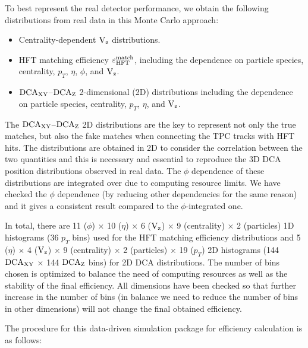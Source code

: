 \documentclass[%
 reprint,	
showpacs,
 amsmath,amssymb,
 aps,
 prc,
]{revtex4-1}
\begin{document}
To best represent the real detector performance, we obtain the following distributions from real data in this Monte Carlo approach:
 \begin{itemize} 
\item Centrality-dependent $\textup{V}_\textup{z}$ distributions.
\item HFT matching efficiency $\varepsilon_{\rm HFT}^{\rm match}$, including the dependence on particle species, centrality, $p_T$, $\eta$, $\phi$, and $\textup{V}_\textup{z}$.
\item $\textup{DCA}_{\textup{XY}}$--$\textup{DCA}_{\textup{Z}}$ 2-dimensional (2D) distributions including the dependence on particle species, centrality, $p_T$, $\eta$, and $\textup{V}_\textup{z}$.
 \end{itemize} 
The $\textup{DCA}_{\textup{XY}}$--$\textup{DCA}_{\textup{Z}}$ 2D distributions are the key to represent not only the true matches, but also the fake matches when connecting the TPC tracks with HFT hits. The distributions are obtained in 2D to consider the correlation between the two quantities and this is necessary and essential to reproduce the 3D DCA position distributions observed in real data. The $\phi$ dependence of these distributions are integrated over due to computing resource limits. We have checked the $\phi$ dependence (by reducing other dependencies for the same reason) and it gives a consistent result compared to the $\phi$-integrated one.

In total, there are 11 ($\phi$) $\times$ 10 ($\eta$) $\times$ 6 ($\textup{V}_\textup{z}$) $\times$ 9 (centrality) $\times$ 2 (particles) 1D histograms (36 $p_T$ bins) used for the HFT matching efficiency distributions and 5 ($\eta$) $\times$ 4 ($\textup{V}_\textup{z}$) $\times$ 9 (centrality) $\times$ 2 (particles) $\times$ 19 ($p_T$) 2D histograms (144 $\textup{DCA}_{\textup{XY}}$ $\times$ 144 $\textup{DCA}_{\textup{Z}}$ bins) for 2D DCA distributions. The number of bins chosen is optimized to balance the need of computing resources as well as the stability of the final efficiency. All dimensions have been checked so that further increase in the number of bins (in balance we need to reduce the number of bins in other dimensions)  will not change the final obtained efficiency.

The procedure for this data-driven simulation package for efficiency calculation is as follows:
\end{document}
